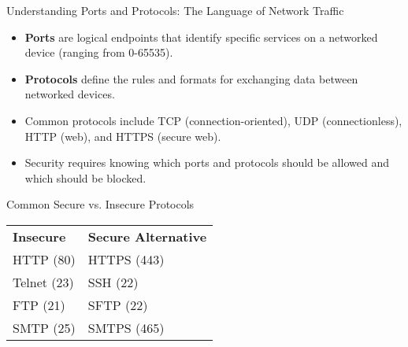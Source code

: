 \documentclass{beamer}
\begin{document}
    \begin{frame}{Understanding Ports and Protocols: The Language of Network Traffic}
    \begin{itemize}
        \item \textbf{Ports} are logical endpoints that identify specific services on a networked device (ranging from 0-65535).
        \item \textbf{Protocols} define the rules and formats for exchanging data between networked devices.
        \item Common protocols include TCP (connection-oriented), UDP (connectionless), HTTP (web), and HTTPS (secure web).
        \item Security requires knowing which ports and protocols should be allowed and which should be blocked.
    \end{itemize}
    
    \begin{exampleblock}{Common Secure vs. Insecure Protocols}
    \begin{tabular}{ll}
    \textbf{Insecure} & \textbf{Secure Alternative} \\
    HTTP (80) & HTTPS (443) \\
    Telnet (23) & SSH (22) \\
    FTP (21) & SFTP (22) \\
    SMTP (25) & SMTPS (465) \\
    \end{tabular}
    \end{exampleblock}
    \end{frame}
\end{document}
